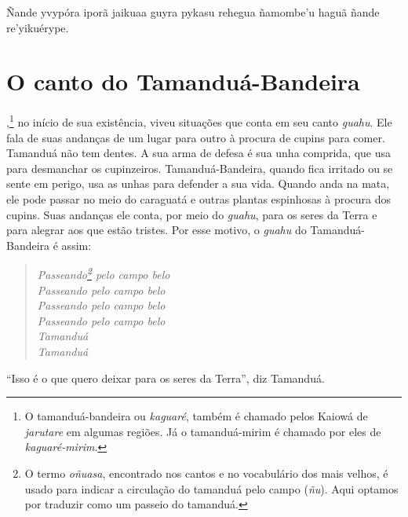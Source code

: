 Ñande yvypóra iporã jaikuaa guyra pykasu rehegua ñamombe'u haguã ñande
re'yikuérype.

\chapter{O canto do Tamanduá-Bandeira}


,\footnote{O tamanduá-bandeira ou \emph{kaguaré}, também é chamado pelos Kaiowá de \emph{jarutare} em algumas regiões. Já o tamanduá-mirim é
  chamado por eles de \emph{kaguaré-mirim}.} no início de sua existência, viveu situações que conta em seu canto \emph{guahu}. Ele fala de suas andanças de um lugar para outro à procura de cupins para comer. Tamanduá não tem dentes. A sua arma de defesa é sua unha comprida, que usa para
desmanchar os cupinzeiros. Tamanduá-Bandeira, quando fica irritado ou se
sente em perigo, usa as unhas para defender a sua vida. Quando anda na
mata, ele pode passar no meio do caraguatá e outras plantas espinhosas à
procura dos cupins. Suas andanças ele conta, por meio do \emph{guahu},
para os seres da Terra e para alegrar aos que estão tristes. Por esse
motivo, o \emph{guahu} do Tamanduá-Bandeira é assim:

\begin{verse}
\itshape
Passeando\footnote{O termo \emph{oñuasa}, encontrado nos cantos e no vocabulário dos mais velhos, é usado para indicar a circulação do tamanduá pelo campo (\emph{ñu}). Aqui optamos por traduzir como um passeio do tamanduá.} pelo campo belo\\
Passeando pelo campo belo\\
Passeando pelo campo belo\\
Passeando pelo campo belo\\
Tamanduá\\
Tamanduá
\end{verse}

``Isso é o que quero deixar para os seres da Terra'', diz \mbox{Tamanduá}.

